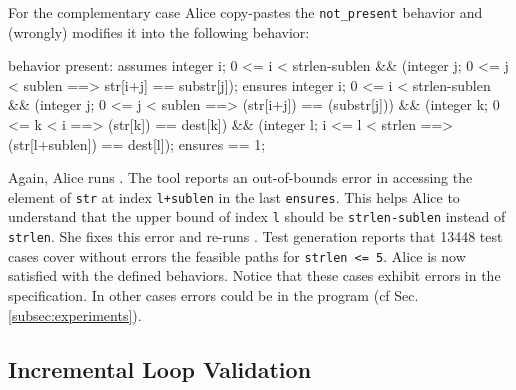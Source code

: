 For the complementary case Alice copy-pastes the \lstinline{not_present}
behavior and (wrongly) modifies it into the following behavior:
\begin{pretty-codeACSL}
behavior present:
 assumes \exists integer i; 0 <= i < strlen-sublen && 
  (\forall integer j; 0 <= j < sublen ==> str[i+j] == substr[j]);
 ensures \exists integer i; 0 <= i < strlen-sublen &&
  (\forall integer j; 0 <= j < sublen ==> \old(str[i+j]) == \old(substr[j])) &&
  (\forall integer k; 0 <= k < i ==> \old(str[k]) == dest[k]) &&
  (\forall integer l; i <= l < strlen ==> \old(str[l+sublen]) == dest[l]);
 ensures \result == 1;
\end{pretty-codeACSL}
Again, Alice runs \stady.
The tool reports an out-of-bounds error in accessing the element 
of \lstinline{str} at index \lstinline{l+sublen}
in the last \lstinline{ensures}. This helps Alice to understand that the upper
bound of index \lstinline'l' should be \lstinline{strlen-sublen} instead of \lstinline{strlen}.
She fixes this error and re-runs \stady. Test generation reports that 13448
test cases cover without errors the feasible paths for
\lstinline{strlen <= 5}. Alice is now satisfied with the defined behaviors.
Notice that these cases exhibit errors in the specification. In other
cases errors could be in the program (cf Sec.\,\ref{subsec:experiments}).


\subsection{Incremental Loop Validation}


